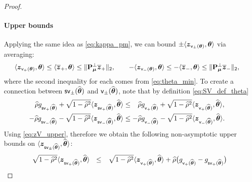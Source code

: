 \begin{proof}
    \paragraph{Upper bounds}
    Applying the same idea as \cref{eq:kappa_pm}, we can bound $\pm \langle \text{\boldmath $z$}_{\mathsf{v}_\pm({\boldsymbol{\theta}})}, {\boldsymbol{\theta}} \rangle$ via averaging:
    \begin{equation}
        \label{eq:zV_upper}
            \langle \text{\boldmath $z$}_{\mathsf{v}_+({\boldsymbol{\theta}})}, {\boldsymbol{\theta}} \rangle \le \langle \overline{\text{\boldmath $z$}}_{+}, {\boldsymbol{\theta}} \rangle \le  \| \mathrm{\bf P}_{{\boldsymbol{\mu}}}^\perp \overline{\text{\boldmath $z$}}_+ \|_2,
            \qquad
            - \langle \text{\boldmath $z$}_{\mathsf{v}_-({\boldsymbol{\theta}})}, {\boldsymbol{\theta}} \rangle \le - \langle \overline{\text{\boldmath $z$}}_{-}, {\boldsymbol{\theta}} \rangle \le  \| \mathrm{\bf P}_{{\boldsymbol{\mu}}}^\perp \overline{\text{\boldmath $z$}}_- \|_2,
    \end{equation}
    where the second inequality for each comes from \cref{eq:theta_min}. 
    To create a connection between $\mathsf{sv}_\pm(\widehat{{\boldsymbol{\theta}}})$ and $\mathsf{v}_\pm(\widehat{{\boldsymbol{\theta}}})$, note that by definition \cref{eq:SV_def_theta}
\begin{equation*}
    \begin{aligned}
        \phantom{-} \widehat\rho g_{\mathsf{sv}_+(\widehat{{\boldsymbol{\theta}}})} + \sqrt{1 - \widehat\rho^2} \langle \text{\boldmath $z$}_{\mathsf{sv}_+(\widehat{{\boldsymbol{\theta}}})}, \widehat{{\boldsymbol{\theta}}} \rangle 
        & \le \phantom{-} \widehat\rho g_{\mathsf{v}_+(\widehat{{\boldsymbol{\theta}}})} + \sqrt{1 - \widehat\rho^2} \langle \text{\boldmath $z$}_{\mathsf{v}_+(\widehat{{\boldsymbol{\theta}}})}, \widehat{{\boldsymbol{\theta}}} \rangle,
        \\
        - \widehat\rho g_{\mathsf{sv}_-(\widehat{{\boldsymbol{\theta}}})} - \sqrt{1 - \widehat\rho^2} \langle \text{\boldmath $z$}_{\mathsf{sv}_-(\widehat{{\boldsymbol{\theta}}})}, \widehat{{\boldsymbol{\theta}}} \rangle 
        & \le - \widehat\rho g_{\mathsf{v}_-(\widehat{{\boldsymbol{\theta}}})} - \sqrt{1 - \widehat\rho^2} \langle \text{\boldmath $z$}_{\mathsf{v}_-(\widehat{{\boldsymbol{\theta}}})}, \widehat{{\boldsymbol{\theta}}} \rangle.
    \end{aligned}
\end{equation*}
Using \cref{eq:zV_upper}, therefore we obtain the following non-asymptotic upper bounds on $\langle \text{\boldmath $z$}_{\mathsf{sv}_\pm(\widehat{{\boldsymbol{\theta}}})}, \widehat{{\boldsymbol{\theta}}} \rangle$:
\begin{equation}
    \label{eq:zSV_upper}
    \begin{aligned}
        \phantom{-} \sqrt{1 - \hat\rho^2} \< \zz_{\mathsf{sv}_+(\hat\vtheta)}, \hat\vtheta \> \ \ 
        & \le   \phantom{-} \sqrt{1 - \hat\rho^2} \< \zz_{\mathsf{v}_+(\hat\vtheta)}, \hat\vtheta \> + \hat\rho \bigl(g_{\mathsf{v}_+(\hat\vtheta)} - g_{\mathsf{sv}_+(\hat\vtheta)} \bigr)  \\

\end{aligned}
\end{equation}
\end{proof}

